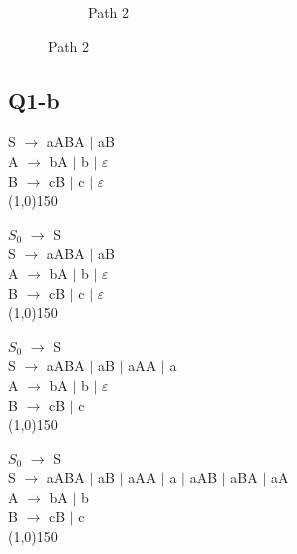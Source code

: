 \documentclass{article}
\begin{document}
\begin{figure}[h]
\begin{subfigure}[h]{0.5\textwidth}
		\caption{Path 2}
		\label{fig:subim2}
	\end{subfigure}
	\label{fig:image2}
\end{figure}

\subsection{Q1-b}
\begin{multicols}{2}
	\noindent
	\begin{minipage}{0.5\textwidth}
		S $\rightarrow$ aABA $\mid$ aB\\
		A $\rightarrow$ bA $\mid$ b $\mid$ $ \varepsilon $\\
		B $ \rightarrow $ cB $ \mid $ c $ \mid $ $ \varepsilon $\\
		\line(1,0){150}\\
	\end{minipage}
	\begin{minipage}{0.5\textwidth}
		$S_0$ $\rightarrow$ S\\
		S $\rightarrow$ aABA $\mid$ aB\\
		A $\rightarrow$ bA $\mid$ b $\mid$ $ \varepsilon $\\
		B $ \rightarrow $ cB $ \mid $ c $ \mid $ $ \varepsilon $\\
				\line(1,0){150}\\
	\end{minipage}
	\begin{minipage}{0.5\textwidth}
		$S_0$ $\rightarrow$ S\\
		S $\rightarrow$ aABA $\mid$ aB $\mid$ aAA $\mid$ a\\
		A $\rightarrow$ bA $\mid$ b $\mid$ $ \varepsilon $\\
		B $ \rightarrow $ cB $ \mid $ c\\
				\line(1,0){150}\\
	\end{minipage}
	\begin{minipage}{0.5\textwidth}
		$S_0$ $\rightarrow$ S\\
		S $\rightarrow$ aABA $\mid$ aB $\mid$ aAA $\mid$ a $\mid$ aAB $\mid$ aBA $\mid$ aA\\
		A $\rightarrow$ bA $\mid$ b \\
		B $ \rightarrow $ cB $ \mid $ c \\
				\line(1,0){150}\\
	\end{minipage}
	\begin{minipage}{0.5\textwidth}

\end{minipage}
\end{multicols}
\end{document}
